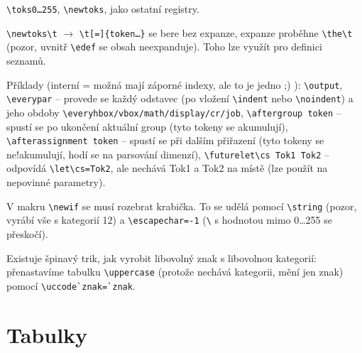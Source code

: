 \documentclass[12pt]{article}					%
\begin{document}
    \begin{definice}
        \verb|\toks0…255|, \verb|\newtoks|, jako ostatní registry.

        \verb|\newtoks\t| $\rightarrow$ \verb|\t[=]{token…}| se bere bez expanze, expanze proběhne \verb|\the\t| (pozor, uvnitř \verb|\edef| se obsah neexpanduje). Toho lze využít pro definici seznamů.

        Příklady (interní = možná mají záporné indexy, ale to je jedno ;) ): \verb|\output|, \verb|\everypar| -- provede se každý odstavec (po vložení \verb|\indent| nebo \verb|\noindent|) a jeho obdoby \verb|\everyhbox/vbox/math/display/cr/job|, \verb|\aftergroup token| -- spustí se po ukončení aktuální group (tyto tokeny se akumulují), \verb|\afterassignment token| -- spustí se při dalším přiřazení (tyto tokeny se ne!akumulují, hodí se na parsování dimenzí), \verb|\futurelet\cs Tok1 Tok2| -- odpovídá \verb|\let\cs=Tok2|, ale nechává Tok1 a Tok2 na místě (lze použít na nepovinné parametry).
    \end{definice}

    \begin{definice}
        V makru \verb|\newif| se musí rozebrat krabička. To se udělá pomocí \verb|\string| (pozor, vyrábí vše s kategorií 12) a \verb|\escapechar=-1| (\verb|\| s hodnotou mimo 0…255 se přeskočí).

        Existuje špinavý trik, jak vyrobit libovolný znak s libovolnou kategorií: přenastavíme tabulku \verb|\uppercase| (protože nechává kategorii, mění jen znak) pomocí \verb|\uccode`znak=`znak|.
    \end{definice}


\section{Tabulky}
\end{document}
